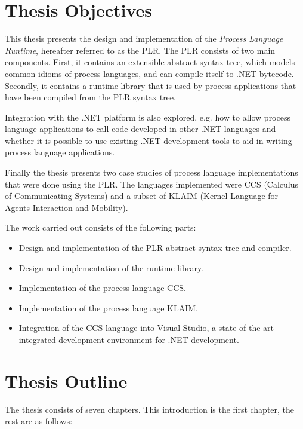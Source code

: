 \section{Thesis Objectives}

	This thesis presents the design and implementation of the \textit{Process 
	Language Runtime}, hereafter referred to as the PLR. The PLR consists of two 
	main components. First, it contains an extensible abstract syntax tree, 
	which models common idioms of process languages, and can compile itself to 
	.NET bytecode. Secondly, it contains a runtime library that is used by 
	process applications that have been compiled from the PLR syntax tree. 

	Integration with the .NET platform is also explored, e.g. how to allow 
	process language applications to call code developed in other .NET languages 
	and whether it is possible to use existing .NET development tools to aid in 
	writing process language applications.

	Finally the thesis presents two case studies of process language 
	implementations that were done using the PLR. The languages implemented were 
	CCS (Calculus of Communicating Systems) and a subset of KLAIM (Kernel 
	Language for Agents Interaction and Mobility).

	The work carried out consists of the following parts:

	\begin{itemize}
  	\item Design and implementation of the PLR abstract syntax tree and 
  				compiler.
  	\item Design and implementation of the runtime library.
  	\item Implementation of the process language CCS.
  	\item Implementation of the process language KLAIM.
  	\item Integration of the CCS language into Visual Studio, a 
  				state-of-the-art integrated development environment for .NET 
  				development.
	\end{itemize}


\section{Thesis Outline}

	The thesis consists of seven chapters. This introduction is the first 
	chapter, the rest are as follows:

